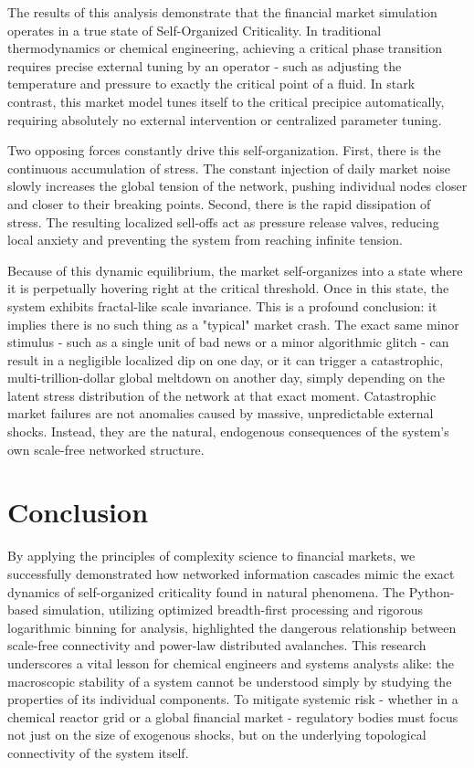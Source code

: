 \documentclass[final,5p,times,twocolumn,authoryear]{elsarticle}
\begin{document}
The results of this analysis demonstrate that the financial market simulation operates in a true state of Self-Organized Criticality. In traditional thermodynamics or chemical engineering, achieving a critical phase transition requires precise external tuning by an operator - such as adjusting the temperature and pressure to exactly the critical point of a fluid. In stark contrast, this market model tunes itself to the critical precipice automatically, requiring absolutely no external intervention or centralized parameter tuning.

Two opposing forces constantly drive this self-organization. First, there is the continuous accumulation of stress. The constant injection of daily market noise slowly increases the global tension of the network, pushing individual nodes closer and closer to their breaking points. Second, there is the rapid dissipation of stress. The resulting localized sell-offs act as pressure release valves, reducing local anxiety and preventing the system from reaching infinite tension.

Because of this dynamic equilibrium, the market self-organizes into a state where it is perpetually hovering right at the critical threshold. Once in this state, the system exhibits fractal-like scale invariance. This is a profound conclusion: it implies there is no such thing as a "typical" market crash. The exact same minor stimulus - such as a single unit of bad news or a minor algorithmic glitch - can result in a negligible localized dip on one day, or it can trigger a catastrophic, multi-trillion-dollar global meltdown on another day, simply depending on the latent stress distribution of the network at that exact moment. Catastrophic market failures are not anomalies caused by massive, unpredictable external shocks. Instead, they are the natural, endogenous consequences of the system's own scale-free networked structure.

\section{Conclusion}
\label{sec:conclusion}
By applying the principles of complexity science to financial markets, we successfully demonstrated how networked information cascades mimic the exact dynamics of self-organized criticality found in natural phenomena. The Python-based simulation, utilizing optimized breadth-first processing and rigorous logarithmic binning for analysis, highlighted the dangerous relationship between scale-free connectivity and power-law distributed avalanches. This research underscores a vital lesson for chemical engineers and systems analysts alike: the macroscopic stability of a system cannot be understood simply by studying the properties of its individual components. To mitigate systemic risk - whether in a chemical reactor grid or a global financial market - regulatory bodies must focus not just on the size of exogenous shocks, but on the underlying topological connectivity of the system itself.
\end{document}
